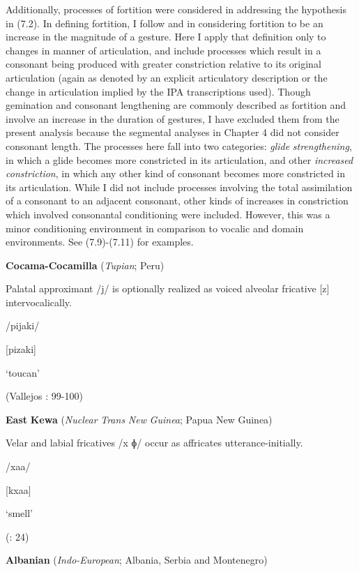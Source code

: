   Additionally, processes of fortition were considered in addressing the hypothesis in (7.2). In defining fortition, I follow \citet{Bybee2015b} and \citet{BybeeEasterday2019} in considering fortition to be an increase in the magnitude of a gesture. Here I apply that definition only to changes in manner of articulation, and include processes which result in a consonant being produced with greater constriction relative to its original articulation (again as denoted by an explicit articulatory description or the change in articulation implied by the IPA transcriptions used). Though gemination and consonant lengthening are commonly described as fortition and involve an increase in the duration of gestures, I have excluded them from the present analysis because the segmental analyses in Chapter 4 did not consider consonant length. The processes here fall into two categories: \textit{glide} \textit{strengthening}, in which a glide becomes more constricted in its articulation, and other \textit{increased} \textit{constriction}, in which any other kind of consonant becomes more constricted in its articulation. While I did not include processes involving the total assimilation of a consonant to an adjacent consonant, other kinds of increases in constriction which involved consonantal conditioning were included. However, this was a minor conditioning environment in comparison to vocalic and domain environments. See (7.9)-(7.11) for examples.

\ea\label{ex:(7.9)}
  \textbf{Cocama-Cocamilla} (\textit{Tupian}; Peru)

Palatal approximant /j/ is optionally realized as voiced alveolar fricative [z] intervocalically.

/pijaki/

[pizaki]

‘toucan’

(Vallejos \citealt{Yopán2010}: 99-100)
\z

\ea\label{ex:(7.10)}
  \textbf{East} \textbf{Kewa} (\textit{Nuclear} \textit{Trans} \textit{New} \textit{Guinea}; Papua New Guinea)

Velar and labial fricatives /x ɸ/ occur as affricates utterance-initially.

/xaa/

[kxaa]

‘smell’

(\citealt{FranklinFranklin1978}: 24)
\z

\ea\label{ex:(7.11)}
  \textbf{Albanian} (\textit{Indo-European}; Albania, Serbia and Montenegro)

